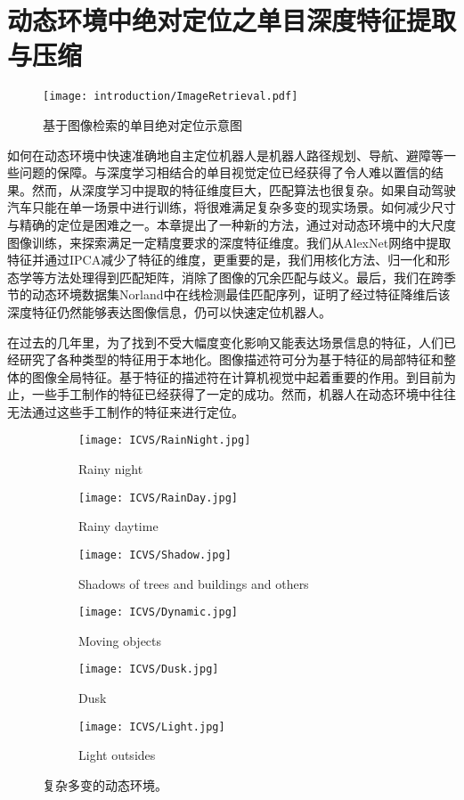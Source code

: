 \chapter{动态环境中绝对定位之单目深度特征提取与压缩}
\label{sec:extract}

\begin{figure}[t]
  \centering
  \texttt{[image: introduction/ImageRetrieval.pdf]}
  \caption{基于图像检索的单目绝对定位示意图}  
  \label{fig:ImageRetrieval}
\end{figure}

如何在动态环境中快速准确地自主定位机器人是机器人路径规划、导航、避障等一些问题的保障。与深度学习相结合的单目视觉定位已经获得了令人难以置信的结果。然而，从深度学习中提取的特征维度巨大，匹配算法也很复杂。如果自动驾驶汽车只能在单一场景中进行训练，将很难满足复杂多变的现实场景。如何减少尺寸与精确的定位是困难之一。本章提出了一种新的方法，通过对动态环境中的大尺度图像训练，来探索满足一定精度要求的深度特征维度。我们从AlexNet网络中提取特征并通过IPCA减少了特征的维度，更重要的是，我们用核化方法、归一化和形态学等方法处理得到匹配矩阵，消除了图像的冗余匹配与歧义。最后，我们在跨季节的动态环境数据集Norland中在线检测最佳匹配序列，证明了经过特征降维后该深度特征仍然能够表达图像信息，仍可以快速定位机器人。

在过去的几年里，为了找到不受大幅度变化影响又能表达场景信息的特征，人们已经研究了各种类型的特征用于本地化\cite{cummins2008fab,sunderhauf2011brief,milford2012seqslam,arroyo2014fast}。图像描述符可分为基于特征的局部特征和整体的图像全局特征。基于特征的描述符在计算机视觉中起着重要的作用。到目前为止，一些手工制作的特征已经获得了一定的成功\cite{lowe2004distinctive,tola2008fast,SURF2006surf,ORB2011orb}。然而，机器人在动态环境中往往无法通过这些手工制作的特征来进行定位。
\begin{figure}[htbp]
 \centering
 \begin{subfigure}[h]{0.23\textwidth}
 \texttt{[image: ICVS/RainNight.jpg]}
 \label{fig:RainNight}
  \caption{Rainy night}
 \end{subfigure}
 \begin{subfigure}[h]{0.23\textwidth}
 \texttt{[image: ICVS/RainDay.jpg]}
  \caption{Rainy daytime}
  \end{subfigure}
 \begin{subfigure}[h]{0.23\textwidth}
 \texttt{[image: ICVS/Shadow.jpg]}
  \caption{Shadows of trees and buildings and others}
 \end{subfigure}
 \begin{subfigure}[h]{0.23\textwidth}
 \texttt{[image: ICVS/Dynamic.jpg]}
  \caption{Moving objects}
  \end{subfigure}
 \begin{subfigure}[h]{0.23\textwidth}
 \texttt{[image: ICVS/Dusk.jpg]}
  \caption{Dusk}
 \end{subfigure}
 \begin{subfigure}[h]{0.23\textwidth}
 \texttt{[image: ICVS/Light.jpg]}
 \caption{Light outsides}
 \end{subfigure}
 \label{fig:Environments}
  \caption{复杂多变的动态环境。}
\end{figure}

